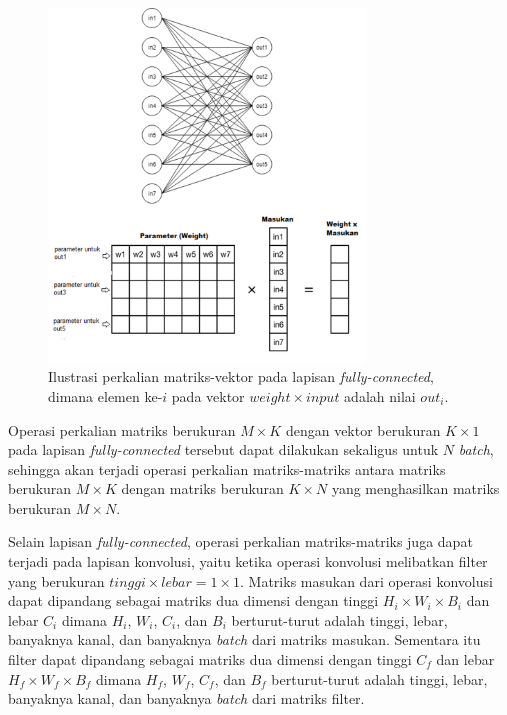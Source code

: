 \begin{figure}
	\centering
	\includegraphics[width=0.75\textwidth]
	{pics/fcmatmul.png}
	\caption{Ilustrasi perkalian matriks-vektor pada lapisan \textit{fully-connected}, dimana elemen ke-$i$ pada vektor $weight \times input$ adalah nilai $out_i$.}
	\label{fig:fcmatmul}
\end{figure}

Operasi perkalian matriks berukuran $M \times K$ dengan vektor berukuran $K \times 1$ pada lapisan \textit{fully-connected} tersebut dapat dilakukan sekaligus untuk $N$ \textit{batch}, sehingga akan terjadi operasi perkalian matriks-matriks antara matriks berukuran $M \times K$ dengan matriks berukuran $K \times N$ yang menghasilkan matriks berukuran $M \times N$.

Selain lapisan \textit{fully-connected}, operasi perkalian matriks-matriks juga dapat terjadi pada lapisan konvolusi, yaitu ketika operasi konvolusi melibatkan filter yang berukuran $tinggi \times lebar = 1 \times 1$. Matriks masukan dari operasi konvolusi dapat dipandang sebagai matriks dua dimensi dengan tinggi $H_{i} \times W_{i} \times B_{i}$ dan lebar $C_{i}$ dimana $H_{i}$, $W_{i}$, $C_{i}$, dan $B_{i}$ berturut-turut adalah tinggi, lebar, banyaknya kanal, dan banyaknya \textit{batch} dari matriks masukan. Sementara itu filter dapat dipandang sebagai matriks dua dimensi dengan tinggi $C_{f}$ dan lebar $H_{f} \times W_{f} \times B_{f}$ dimana $H_{f}$, $W_{f}$, $C_{f}$, dan $B_{f}$ berturut-turut adalah tinggi, lebar, banyaknya kanal, dan banyaknya \textit{batch} dari matriks filter.

